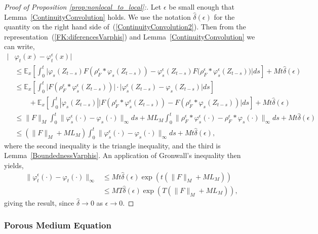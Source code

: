 \documentclass[EJP]{ejpecp} %
\newcommand{\IE}{\mathbb E}
\begin{document}
\begin{proof}[Proof of Proposition \ref{prop:nonlocal_to_local}:]
Let $\epsilon$ be small enough that Lemma~\ref{ContinuityConvolution} holds. 
We use the notation $\widehat{\delta}(\epsilon)$ for the quantity on the right hand side 
of~(\ref{ContinuityConvolution2}).
Then from the representation~(\ref{FK:diferencesVarphis}) 
and Lemma~\ref{ContinuityConvolution} we can write,
\begin{align*}
| &\varphi_t(x) - \varphi^\epsilon_t(x)|  \\ 
& \leq \IE_x\left[ \int_0^t\Big| \varphi_s(Z_{t-s})
    F(\rho^\epsilon_F*\varphi_s(Z_{t-s}))
    -\varphi^\epsilon_s(Z_{t-s})
    F\big(\rho^\epsilon_F*\varphi^\epsilon_s(Z_{t-s})\big)\Big| ds \right] 
    +M t \widehat{\delta}(\epsilon)   \\ 
& \leq \IE_x\left[ \int_0^t \big|F(\rho^\epsilon_F*\varphi^\epsilon_s(Z_{t-s}))\big|\cdot
    \big|\varphi^\epsilon_s(Z_{t-s})-\varphi_s(Z_{t-s})\big| ds  \right] \\ 
    & \qquad +  \IE_x\left[\int_0^t |\varphi_s(Z_{t-s})| 
    \big|F(\rho^\epsilon_F*\varphi^\epsilon_s(Z_{t-s}))
    -F(\rho^\epsilon_F*\varphi_s(Z_{t-s}))\big| ds \right] 
    + M t \widehat{\delta}(\epsilon)  \\ 
& \leq \| F \|_M \int_0^t \| \varphi^\epsilon_s(\cdot) 
    - \varphi_s(\cdot) \|_\infty ds
      + M L_M \int_0^t \| \rho^\epsilon_F*\varphi^\epsilon_s(\cdot)
    -\rho^\epsilon_F*\varphi_s(\cdot) \|_\infty ds 
    +  M  t \widehat{\delta}(\epsilon)  \\ 
& \leq (\| F \|_M + M L_M) 
    \int_0^t \| \varphi^\epsilon_s(\cdot) - \varphi_s(\cdot) \|_\infty ds 
    + M  t \widehat{\delta}(\epsilon),
\end{align*}
where the second inequality is the triangle inequality, 
and the third is Lemma~\ref{BoundednessVarphis}. 
An application of Gronwall's inequality then yields,
\begin{align*}
\| \varphi^\epsilon_t(\cdot)-\varphi_t(\cdot)\|_\infty 
&\leq M  t \widehat{\delta}(\epsilon)  
\exp(t (\| F \|_M + M L_M)) \\ 
& \leq  M  T \widehat{\delta}(\epsilon)  \exp(T(\| F \|_M + M L_M)),
\end{align*}
	giving the result, since $\widehat{\delta}\to 0$ as $\epsilon\to 0$.
\end{proof}


\subsubsection{Porous Medium Equation}
\label{sec:pme}
\end{document}
